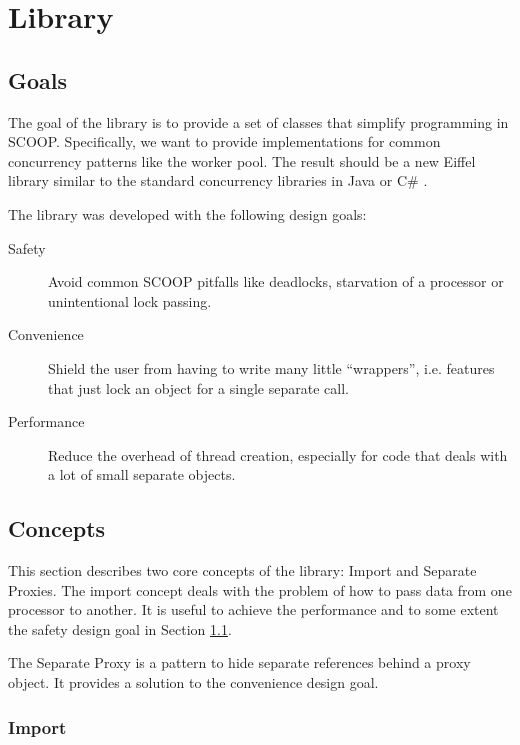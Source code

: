 \section {Library}
\label{sec:library}
 
\subsection{Goals}
\label{sec:goals}

The goal of the library is to provide a set of classes that simplify programming in SCOOP. 
Specifically, we want to provide implementations for common concurrency patterns like the worker pool.
The result should be a new Eiffel library similar to the standard concurrency libraries in Java \cite{web:java-concurrency} or C\# \cite{web:ms-tpl}.

The library was developed with the following design goals:

\begin{description}
 \item [Safety]\label{item:safety} Avoid common SCOOP pitfalls like deadlocks, starvation of a processor or unintentional lock passing.
 \item [Convenience]\label{item:convenience} Shield the user from having to write many little ``wrappers'', i.e. features that just lock an object for a single separate call.
 \item [Performance]\label{item:performance} Reduce the overhead of thread creation, especially for code that deals with a lot of small separate objects.
\end{description}

\subsection{Concepts}

This section describes two core concepts of the library: Import and Separate Proxies.
The import concept deals with the problem of how to pass data from one processor to another.
It is useful to achieve the performance and to some extent the safety design goal in Section \ref{sec:goals}.

The Separate Proxy  is a pattern to hide separate references behind a proxy object.
It provides a solution to the convenience design goal.

\subsubsection{Import}
\label{sec:concepts:import}

